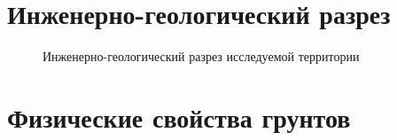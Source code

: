 \chapter{Инженерно-геологический разрез}\label{app:razrez}

\begin{figure}
  \caption{Инженерно-геологический разрез исследуемой территории}\label{fig:fig}
\end{figure}
%    


\chapter{Физические свойства грунтов}\label{app:phisics}

